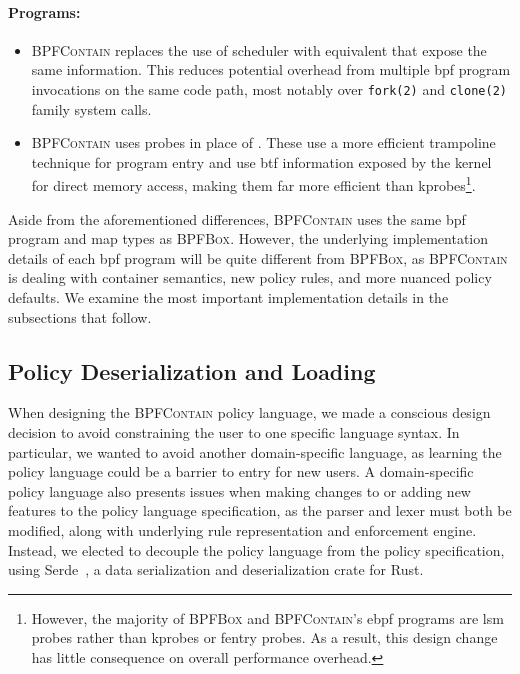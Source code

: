 \documentclass[
  fontsize=12pt,
  titlepage=firstiscover,
  paper=letter,
oneside,
  cleardoublepage=plain,
  parskip=half-,
  DIV=10,
  parindent,
  appendixprefix,
  chapterprefix,
  listof=totoc,
]{scrbook}
\newcommand{\bpfbox}{\textsc{BPFBox}}
\newcommand{\bpfcontain}{\textsc{BPFContain}}
\begin{document}
\paragraph*{Programs:}
\begin{itemize}
  \item \bpfcontain{} replaces the use of scheduler \textbf{} with
  equivalent \textbf{} that expose the same information. This
  reduces potential overhead from multiple \gls{bpf} program invocations on the same code
  path, most notably over \texttt{fork(2)} and \texttt{clone(2)} family system calls.

  \item \bpfcontain{} uses \textbf{} probes in place of
  \textbf{}. These use a more efficient trampoline technique for program
  entry and use \gls{btf} information exposed by the kernel for direct memory access,
  making them far more efficient than kprobes\footnote{However, the majority of \bpfbox{} and
  \bpfcontain{}'s \gls{ebpf} programs are \gls{lsm} probes rather than kprobes or fentry
  probes. As a result, this design change has little consequence on overall performance overhead.}.
\end{itemize}

Aside from the aforementioned differences, \bpfcontain{} uses the same \gls{bpf} program
and map types as \bpfbox{}. However, the underlying implementation details of each
\gls{bpf} program will be quite different from \bpfbox{}, as \bpfcontain{} is dealing with
container semantics, new policy rules, and more nuanced policy defaults. We examine the
most important implementation details in the subsections that follow.



\subsection{Policy Deserialization and Loading}\label{ss:bpfcontain-serde}

When designing the \bpfcontain{} policy language, we made a conscious design decision to
avoid constraining the user to one specific language syntax. In particular, we wanted to
avoid another domain-specific language, as learning the policy language could be a barrier
to entry for new users. A domain-specific policy language also presents issues when making
changes to or adding new features to the policy language specification, as the parser and
lexer must both be modified, along with underlying rule representation and enforcement
engine. Instead, we elected to decouple the policy language from the policy specification,
using Serde~\cite{serde}, a data serialization and deserialization crate for Rust.
\end{document}
